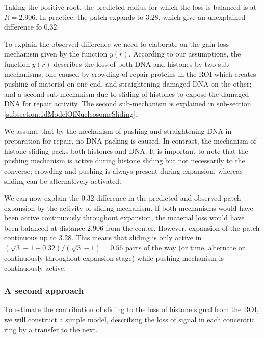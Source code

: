 \documentclass[12pt]{report}
\begin{document}
Taking the positive root, the predicted radius for which the loss is balanced is at $R=2.906$. In practice, the patch expands to $3.28$, which give an unexplained difference fo $0.32$. 

To explain the observed difference we need to elaborate on the gain-loss mechanism given by the function $y(r)$. According to our assumptions, the function $y(r)$ describes the loss of both DNA and histones by two sub-mechanisms; one caused by crowding of repair proteins in the ROI which creates pushing of material on one end, and straightening damaged DNA on the other; and a second sub-mechanism due to sliding of histones to expose the damaged DNA for repair activity. The second sub-mechanism is explained in sub-section \ref{subsection:1dModelOfNucleosomeSliding}.  

We assume that by the mechanism of pushing and straightening DNA in preparation for repair, no DNA packing is caused. In contrast, the mechanism of histone sliding packs both histones and DNA. It is important to note that the pushing mechanism is active during histone sliding but not necessarily to the converse; crowding and pushing is always present during expansion, whereas sliding can be alternatively activated. 

We can now explain the 0.32 difference in the predicted and observed patch expansion by the activity of sliding mechanism. 
If both mechanisms would have been active continuously throughout expansion, the material loss would have been balanced at distance $2.906$ from the center. However, expansion of the patch continuous up to 3.28. This means that sliding is only active in $(\sqrt{3}-1-0.32)/(\sqrt{3}-1) =0.56$  parts of the way (or time, alternate or continuously throughout expansion stage) while pushing mechanism is continuously active.




\subsubsection{A second approach}
To estimate the contribution of sliding to the loss of histone signal from the ROI, we will construct a simple model, describing the loss of signal in each concentric ring by a transfer to the next. 
\end{document}
